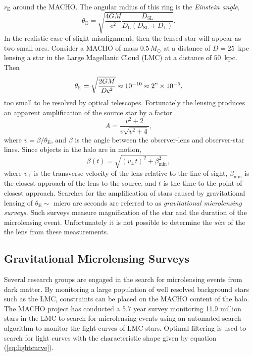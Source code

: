 $r_\mathrm{E}$ around the MACHO. The angular radius of this ring is the
\emph{Einstein angle},
\begin{equation}
\theta_\mathrm{E} = \sqrt{\frac{4GM}{c^2} \frac{D_\mathrm{SL}}
{D_\mathrm{L}\left(D_\mathrm{SL} + D_\mathrm{L}\right)}}.
\end{equation}
In the realistic case of slight misalignment, then the lensed star will appear
as two small arcs. Consider a MACHO of mass $0.5\,M_\odot$ at a distance of $D
= 25$~kpc lensing a star in the Large Magellanic Cloud (LMC) at a distance of
$50$~kpc. Then
\begin{equation}
\theta_\mathrm{E} = \sqrt{\frac{2GM}{Dc^2}} \approx 10^{-10} \approx 2" \times
10^{-5},
\end{equation}
too small to be resolved by optical telescopes. Fortunately the
lensing produces an apparent amplification of the source star by a factor
\cite{1964MNRAS.128..295R}
\begin{equation}
A = \frac{v^2 + 2}{v\sqrt{v^2 + 4}},
\label{eq:lightcurve}
\end{equation}
where $v = \beta / \theta_\mathrm{E}$, and $\beta$ is the angle between the
observer-lens and observer-star lines. Since objects in the halo are in
motion,
\begin{equation}
\beta(t) = \sqrt{ (v_\perp t)^2 + \beta_\mathrm{min}^2 },
\end{equation}
where $v_\perp$ is the transverse velocity of the lens relative to the 
line of sight, $\beta_\mathrm{min}$ is the closest approach of the lens to
the source, and $t$ is the time to the point of closest
approach\cite{Paczynski:1985jf,Griest:1990vu}. 
Searches for the amplification of stars caused by gravitational lensing of
$\theta_\mathrm{E} \sim $ micro arc seconds are referred to as
\emph{gravitational microlensing surveys.} Such surveys measure
magnification of the star and the duration of the microlensing event. 
Unfortunately it is not possible to determine the \emph{size} of the
the lens from these measurements.

\subsection{Gravitational Microlensing Surveys}

Several research groups are engaged in the search for microlensing events from
dark matter\cite{Alcock:2000ph,Afonso:2002xq}. By monitoring a large
population of well resolved background stars such as the LMC, constraints can
be placed on the MACHO content of the halo. The MACHO project has conducted a
5.7 year survey monitoring 11.9 million stars in the LMC to search for
microlensing events\cite{Alcock:2000ph} using an automated search algorithm to
monitor the light curves of LMC stars. Optimal filtering is used to search for
light curves with the characteristic shape given by equation
(\ref{eq:lightcurve}).

